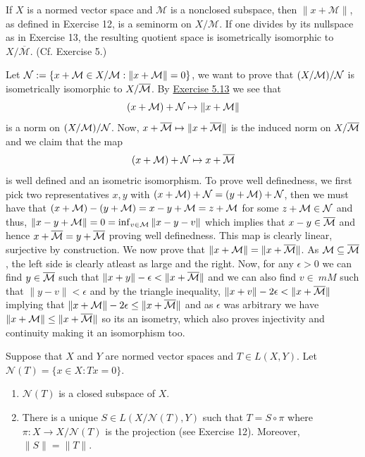 \documentclass[12pt,a4paper]{article}
\begin{document}
\begin{problem}\label{prob:5-14}
If $X$ is a normed vector space and $\mathcal{M}$ is a nonclosed subspace, then $\|x+\mathcal{M}\|$, as defined in Exercise 12, is a seminorm on $X/\mathcal{M}$. If one divides by its nullspace as in Exercise 13, the resulting quotient space is isometrically isomorphic to $X/\overline{\mathcal{M}}$. (Cf. Exercise 5.)
\end{problem}
\begin{solution}
    Let $\mathcal{N}:= \qty{x+\mathcal{M}\in X/\mathcal{M}: \|x+\mathcal{M}\|=0}$, we want to prove that $(X/\mathcal{M})/\mathcal{N}$ is isometrically isomorphic to $X/\overline{\mathcal{M}}$. 
    By \hyperref[prob:5-13]{Exercise 5.13} we see that 
    \[
        (x+\mathcal{M})+\mathcal{N}\mapsto\|x+\mathcal{M}\| 
    \]
    is a norm on $(X/\mathcal{M})/\mathcal{N}$. 
    Now, $x+\overline{\mathcal{M}}\mapsto \|x+\overline{\mathcal{M}}\|$ is the induced norm on $X/\overline{\mathcal{M}}$ and we claim that the map 
    \[
        (x+\mathcal{M})+\mathcal{N}\mapsto x+\overline{\mathcal{M}}
    \]
    is well defined and an isometric isomorphism. 
    To prove well definedness, we first pick two representatives $x,y$ with $(x+\mathcal{M})+\mathcal{N}=(y+\mathcal{M})+\mathcal{N}$, then we must have that $(x+\mathcal{M})-(y +\mathcal{M})=x-y+\mathcal{M}=z+\mathcal{M}$ for some $z+\mathcal{M}\in\mathcal{N}$ and thus, $\|x-y+\mathcal{M}\|=0=\inf_{v\in\mathcal{M}} \|x-y-v\|$ which implies that $x-y\in\overline{\mathcal{M}}$ and hence $x+\overline{\mathcal{M}}=y+\overline{\mathcal{M}}$ proving well definedness. 
    This map is clearly linear, surjective by construction. 
    We now prove that $ \|x+\mathcal{M}\|= \|x+\overline{\mathcal{M}}\|$. 
    As $\mathcal{M} \subseteq\overline{\mathcal{M}}$, the left side is clearly atleast as large and the right. 
    Now, for any $\epsilon>0$ we can find $y\in\overline{\mathcal{M}}$ such that $ \|x+y\|-\epsilon< \|x+\overline{\mathcal{M}}\|$ and we can also find $v\in\ m M$ such that $ \|y-v\|<\epsilon$ and by the triangle inequality, $ \|x+v\|-2\epsilon< \|x+\overline{\mathcal{M}}\|$ implying that $ \|x+\mathcal{M}\|-2\epsilon\leq \|x+\overline{\mathcal{M}}\|$ and as $\epsilon$ was arbitrary we have $ \|x+\mathcal{M}\|\leq \|x+\overline{\mathcal{M}}\|$ so its an isometry, which also proves injectivity and continuity making it an isomorphism too.  
\end{solution}
\begin{problem}\label{prob:5-15}
Suppose that $X$ and $Y$ are normed vector spaces and $T \in L(X,Y)$. Let $\mathcal{N}(T) = \{x \in X : Tx = 0\}$.
\begin{enumerate}[label=\alph*.]
\item $\mathcal{N}(T)$ is a closed subspace of $X$.
\item There is a unique $S \in L(X/\mathcal{N}(T), Y)$ such that $T = S \circ \pi$ where $\pi : X \rightarrow X/\mathcal{N}(T)$ is the projection (see Exercise 12). Moreover, $\|S\| = \|T\|$.
\end{enumerate}
\end{problem}
\end{document}
